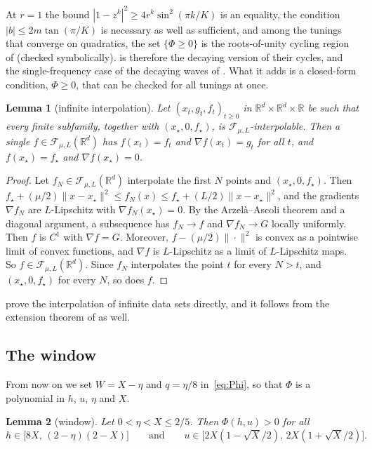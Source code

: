 \documentclass[11pt, a4paper]{article}
\newtheorem{lemma}{Lemma}
\theoremstyle{definition}
\newcommand{\R}{\mathbb{R}}
\newcommand{\F}{\mathcal{F}_{\mu,L}}
\begin{document}
At $r=1$ the bound $|1-z^k|^2\ge4r^k\sin^2(\pi k/K)$ is an equality, the condition $|b|\le2m\tan(\pi/K)$ is necessary as
well as sufficient, and among the tunings that converge on quadratics, the set $\{\Phi\ge0\}$ is the roots-of-unity
cycling region of \citet[Thm.~3.5]{goujaud2025provable} (checked symbolically).  is therefore the
decaying version of their cycles, and the single-frequency case of the decaying waves of
\citet[Lemma~3.4, Thm.~3.5(c)]{pasechniuk2026two}. What it adds is a closed-form condition, $\Phi\ge0$, that can be
checked for all tunings at once.

\begin{lemma}[infinite interpolation]
  \label{lem:infinite}
  Let $(x_t,g_t,f_t)_{t\ge0}$ in $\R^d\times\R^d\times\R$ be such that every finite subfamily, together with
  $(x_\star,0,f_\star)$, is $\F$-interpolable. Then a single $f\in\F(\R^d)$ has $f(x_t)=f_t$ and $\nabla f(x_t)=g_t$ for
  all $t$, and $f(x_\star)=f_\star$ and $\nabla f(x_\star)=0$.
\end{lemma}

\begin{proof}
  Let $f_N\in\F(\R^d)$ interpolate the first $N$ points and $(x_\star,0,f_\star)$. Then
  $f_\star+(\mu/2)\|x-x_\star\|^2\le f_N(x)\le f_\star+(L/2)\|x-x_\star\|^2$, and the gradients $\nabla f_N$ are
  $L$-Lipschitz with $\nabla f_N(x_\star)=0$. By the Arzel\`a--Ascoli theorem and a diagonal argument, a subsequence has
  $f_N\to f$ and $\nabla f_N\to G$ locally uniformly. Then $f$ is $C^1$ with $\nabla f=G$. Moreover,
  $f-(\mu/2)\|\cdot\|^2$ is convex as a pointwise limit of convex functions, and $\nabla f$ is $L$-Lipschitz as a
  limit of $L$-Lipschitz maps. So $f\in\F(\R^d)$. Since $f_N$ interpolates the point $t$ for every $N>t$, and
  $(x_\star,0,f_\star)$ for every $N$, so does $f$.
\end{proof}

 prove the interpolation of infinite data sets directly, and it follows from the
extension theorem of \citet{azagra2017extension} as well.

\subsection{The window}

From now on we set $W=X-\eta$ and $q=\eta/8$ in~\eqref{eq:Phi}, so that $\Phi$ is a polynomial in $h$, $u$, $\eta$ and
$X$.

\begin{lemma}[window]
  \label{lem:window}
  Let $0<\eta<X\le2/5$. Then $\Phi(h,u)>0$ for all
  \[
    h\in\bigl[8X,\,(2-\eta)(2-X)\bigr]\qquad\text{and}\qquad
    u\in\bigl[2X(1-\sqrt X/2),\,2X(1+\sqrt X/2)\bigr].
  \]
\end{lemma}
\end{document}
